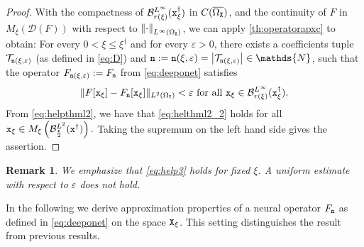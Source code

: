 \documentclass[10pt]{article}
\numberwithin{equation}{section}
\newtheorem{remark}[remark]{Remark}
\theoremstyle{nonumberplain}
\newtheorem{proof}{Proof}
\newcommand{\N}{\mathds{N}}
\newcommand{\dom}[1]{\mathcal{D}\left(#1\right)}
\newcommand{\abs}[1]{\left|#1\right|}
\newcommand{\norm}[1]{\left\|#1\right\|}
\newcommand{\norms}[1]{\|#1\|}
\newcommand{\ve}{\varepsilon}
\newcommand{\X}{{\tt X}}
\newcommand{\Y}{{\tt Y}}
\newcommand{\n}{{\tt n}}
\newcommand{\x}{{\tt x}}
\newcommand{\xdag}{\x^\dagger}
\begin{document}
\begin{proof}
With the compactness of $\mathcal{B}_{r(\xi)}^{L^\infty}(\xdag_\xi)$ in $C(\overline{\Omega_\X})$, and the continuity of $F$ in $M_\xi(\dom{F})$ with respect to $\norm{\cdot}_{L^\infty(\Omega_\X)}$, we can apply \autoref{th:operatorapxc} to obtain: For every $0 < \xi \leq \xi^\dagger$ and for every $\ve > 0$, there exists a coefficients tuple $\mathcal{T}_{\n(\xi,\ve)}$ (as defined in \autoref{eq:D}) and $\n := \n(\xi,\ve) = \abs{\mathcal{T}_{\n(\xi,\ve)}} \in \N$, such that the operator $F_{\n(\xi,\ve)} := F_{\n}$ from \autoref{eq:deeponet} satisfies
          \begin{equation} \label{eq:helthml2_2}
             \norms{F[\x_\xi] - F_\n[\x_\xi]}_{L^2(\Omega_\Y)} < \ve \text{ for all } \x_\xi \in \mathcal{B}_{r(\xi)}^{L^\infty}(\xdag_\xi).
        \end{equation}
        From \autoref{eq:helpthml2}, we have that \autoref{eq:helthml2_2} holds for all $\x_\xi \in M_\xi\left(\mathcal{B}_{\frac{\tt r}{2}}^{L^2}(\xdag)\right).$ Taking the supremum on the left hand side gives the assertion.
\end{proof}
\begin{remark} We emphasize that \autoref{eq:help3} holds for fixed $\xi$. A uniform estimate with respect to $\ve$ does not hold.
\end{remark}
In the following we derive approximation properties of a neural operator $F_\n$ as defined in \autoref{eq:deeponet} on the space $\X_\xi$. This setting distinguishes the result from previous results.
\end{document}
